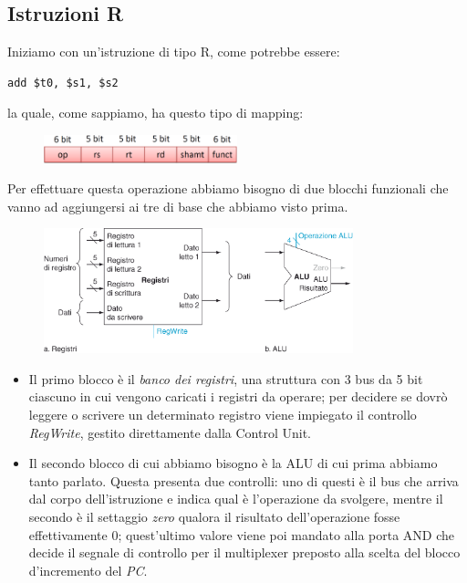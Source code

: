 \documentclass[class=book, crop=false, oneside]{standalone}
\begin{document}
\subsection{Istruzioni R}
Iniziamo con un’istruzione di tipo R, come potrebbe essere:
\begin{verbatim}
add $t0, $s1, $s2
\end{verbatim}
la quale, come sappiamo, ha questo tipo di mapping:
\begin{figure}[H]
	\centering
	\includegraphics[width=0.5\textwidth,keepaspectratio]{mappatura.png}
\end{figure}
Per effettuare questa operazione abbiamo bisogno di due blocchi funzionali che vanno ad aggiungersi ai tre di base che abbiamo visto prima.
\begin{figure}[H]
	\centering
	\includegraphics[width=0.8\textwidth,keepaspectratio]{R_ex.png}
\end{figure}
\begin{itemize}
	\item Il primo blocco è il \emph{banco dei registri}, una struttura con 3 bus da 5 bit ciascuno in cui vengono caricati i registri da operare; per decidere se dovrò leggere o scrivere un determinato registro viene impiegato il controllo \emph{RegWrite}, gestito direttamente dalla Control Unit.
	\item Il secondo blocco di cui abbiamo bisogno è la ALU di cui prima abbiamo tanto parlato. Questa presenta due controlli: uno di questi è il bus che arriva dal corpo dell'istruzione e indica qual è l'operazione da svolgere, mentre il secondo è il settaggio \emph{zero} qualora il risultato dell'operazione fosse effettivamente 0; quest'ultimo valore viene poi mandato alla porta AND che decide il segnale di controllo per il multiplexer preposto alla scelta del blocco d'incremento del \emph{PC}.
\end{itemize}
\end{document}
